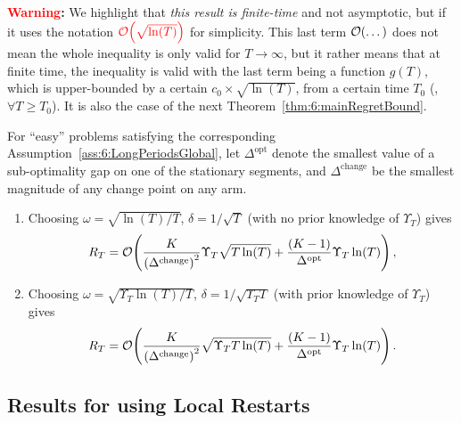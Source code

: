 \textbf{\textcolor{red}{Warning}:}
%
We highlight that \emph{this result is finite-time} and not asymptotic, but if it uses the notation $\textcolor{red}{\mathop{}\mathopen{}\mathcal{O}\mathopen{}\left(\sqrt{\ln(T)}\right)}$ for simplicity.
This last term $\mathop{}\mathopen{}\mathcal{O}\mathopen{}\left(\dots\right)$ does not mean the whole inequality is only valid for $T\to\infty$, but it rather means that at finite time, the inequality is valid with the last term being a function $g(T)$, which is upper-bounded by a certain $c_0 \times \sqrt{\ln(T)}$, from a certain time $T_0$ (\ie, $\forall T \geq T_0$).
It is also the case of the next Theorem~\ref{thm:6:mainRegretBound}.


\begin{corollary}\label{cor:6:Global}
    For ``easy'' problems satisfying the corresponding Assumption~\ref{ass:6:LongPeriodsGlobal},
    let $\Delta^{\text{opt}}$ denote the smallest value of a sub-optimality gap on one of the stationary segments, and $\Delta^{\text{change}}$ be the smallest magnitude of any change point on any arm.
    \begin{enumerate}
        \item
        Choosing $\omega = \sqrt{\ln(T)/T}$, $\delta = 1/\sqrt{T}$ (with no prior knowledge of $\Upsilon_T$) gives
        \begin{equation}
            R_T = \mathop{}\mathopen{}\mathcal{O}\mathopen{}\left(\frac{K}{\left(\Delta^{\text{change}}\right)^2} \Upsilon_T\sqrt{T\ln(T)} + \frac{(K-1)}{\Delta^{\text{opt}}} \Upsilon_T\ln(T)\right),
        \end{equation}
        \item
        Choosing $\omega = \sqrt{\Upsilon_T\ln(T) / T}$, $\delta = 1 / \sqrt{\Upsilon_T T}$ (with prior knowledge of $\Upsilon_T$) gives
        \begin{equation}
            R_T = \mathop{}\mathopen{}\mathcal{O}\mathopen{}\left(\frac{K}{\left(\Delta^{\text{change}}\right)^2}\sqrt{\Upsilon_T T \ln(T)} + \frac{(K-1)}{\Delta^{\text{opt}}} \Upsilon_T\ln(T)\right).
        \end{equation}
    \end{enumerate}
\end{corollary}


\subsection{Results for \GLRklUCB{} using Local Restarts}

